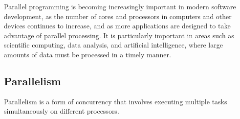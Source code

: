 Parallel programming is becoming increasingly important in modern software development, as the number of cores and processors in computers and other devices continues to increase, and as more applications are designed to take advantage of parallel processing.
It is particularly important in areas such as scientific computing, data analysis, and artificial intelligence, where large amounts of data must be processed in a timely manner.

\pagebreak

\subsection{Parallelism}
Parallelism is a form of concurrency that involves executing multiple tasks simultaneously on different processors.


